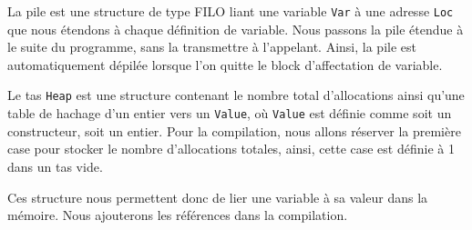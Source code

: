 \documentclass{rapportECL}
\begin{document}
La pile est une structure de type FILO liant une variable \verb|Var| à une adresse \verb|Loc| que nous étendons à chaque définition de variable. Nous passons la pile étendue à le suite du programme, sans la transmettre à l'appelant. Ainsi, la pile est automatiquement dépilée lorsque l'on quitte le block d'affectation de variable.

Le tas \verb|Heap| est une structure contenant le nombre total d'allocations ainsi qu'une table de hachage d'un entier vers un \verb|Value|, où \verb|Value| est définie comme soit un constructeur, soit un entier.
Pour la compilation, nous allons réserver la première case pour stocker le nombre d'allocations totales, ainsi, cette case est définie à 1 dans un tas vide.

Ces structure nous permettent donc de lier une variable à sa valeur dans la mémoire. Nous ajouterons les références dans la compilation.







\end{document}
